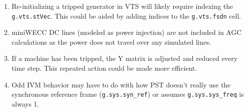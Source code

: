 \begin{enumerate}
	\item Re-initializing a tripped generator in VTS will likely require indexing the \verb|g.vts.stVec|. This could be aided by adding indices to the \verb|g.vts.fsdn| cell.
	\item miniWECC DC lines (modeled as power injection) are not included in AGC calculations as the power does not travel over any simulated lines.
	\item If a machine has been tripped, the Y matrix is adjusted and reduced every time step. This repeated action could be made more efficient.
	\item Odd IVM behavior may have to do with how PST doesn't really use the synchronous reference frame (\verb|g.sys.syn_ref|) or assumes \verb|g.sys.sys_freq| is always 1.
\end{enumerate}
